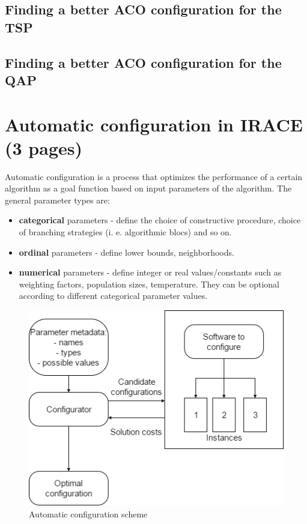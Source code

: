 \documentclass[12pt]{article}
\begin{document}
\subsection{Finding a better ACO configuration for the TSP}

\subsection{Finding a better ACO configuration for the QAP}

\section{Automatic configuration in IRACE (3 pages)}

Automatic configuration is a process that optimizes the performance of a certain algorithm as a goal function based on input parameters of the algorithm. The general parameter types are:
 
\begin{itemize}
\item \textbf{categorical} parameters - define the choice of constructive procedure, choice of branching strategies (i. e. algorithmic blocs) and so on.
\item \textbf{ordinal} parameters - define lower bounds, neighborhoods.
\item \textbf{numerical} parameters - define integer or real values/constants such as weighting factors, population sizes, temperature. They can be optional according to different categorical parameter values.
\end{itemize}


\begin{figure}[htbp!]
  \centering
    \includegraphics[scale=0.7]{configuration-top-level.png}
  \caption{Automatic configuration scheme}
  \label{fig:autoconf}
\end{figure}
\end{document}
